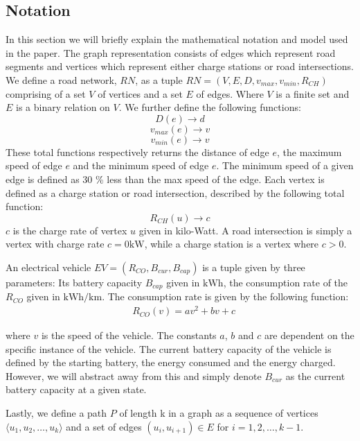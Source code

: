 \subsection{Notation}
In this section we will briefly explain the mathematical notation and model used in the paper. The graph representation consists of edges which represent road segments and vertices which represent either charge stations or road intersections. We define a road network, $RN$, as a tuple $RN=(V,E,D,v_{max},v_{min},R_{CH})$ comprising of a set $V$ of vertices and a set $E$ of edges. Where $V$ is a finite set and $E$ is a binary relation on $V$. We further define the following functions:
\[ D(e)\rightarrow d \] 
\[ v_{max}(e)\rightarrow v \]
\[ v_{min}(e)\rightarrow v \]
These total functions respectively returns the distance of edge $e$, the maximum speed of edge $e$ and the minimum speed of edge $e$. The minimum speed of a given edge is defined as 30 \% less than the max speed of the edge. Each vertex is defined as a charge station or road intersection, described by the following total function:
\[R_{CH}(u)\rightarrow c\]
$c$ is the charge rate of vertex $u$ given in kilo-Watt. A road intersection is simply a vertex with charge rate $c = 0\si{\kW}$, while a charge station is a vertex where $c > 0$.

An electrical vehicle $EV=(R_{CO},B_{cur},B_{cap})$ is a tuple given by three parameters: Its battery capacity $B_{cap}$ given in $\si{\kWh}$, the consumption rate of the $R_{CO}$ given in $\si{\kWh\per\km}$. The consumption rate is given by the following function:
\begin{equation}
\begin{aligned}
 & R_{CO}(v)=av^2+bv+c
\end{aligned}
\end{equation}\label{eq:chargingFunc}

where $v$ is the speed of the vehicle. The constants $a$, $b$ and $c$ are dependent on the specific instance of the vehicle. The current battery capacity of the vehicle is defined by the starting battery, the energy consumed and the energy charged. However, we will abstract away from this and simply denote $B_{cur}$ as the current battery capacity at a given state.

Lastly, we define a path $P$ of length k in a graph as a sequence of vertices $\langle u_1,u_2,\dots,u_k \rangle$ and a set of edges $(u_{i},u_{i+1})\in E$ for $i=1,2,\dots,k-1$.


